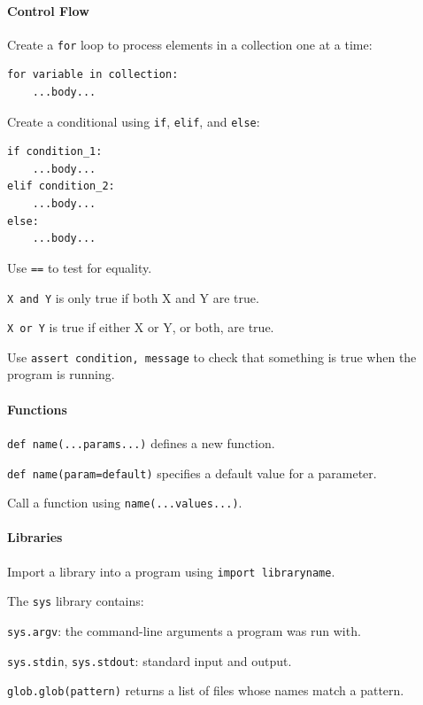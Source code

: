 \documentclass{book}
\begin{document}
\mbox{}\paragraph{Control Flow}

\begin{swcitemize}
\item
  Create a \texttt{for} loop to process elements in a collection one at
  a time:

\begin{verbatim}
for variable in collection:
    ...body...
\end{verbatim}
\item
  Create a conditional using \texttt{if}, \texttt{elif}, and
  \texttt{else}:

\begin{verbatim}
if condition_1:
    ...body...
elif condition_2:
    ...body...
else:
    ...body...
\end{verbatim}
\item
  Use \texttt{==} to test for equality.
\item
  \texttt{X and Y} is only true if both X and Y are true.
\item
  \texttt{X or Y} is true if either X or Y, or both, are true.
\item
  Use \texttt{assert condition, message} to check that something is true
  when the program is running.
\end{swcitemize}

\mbox{}\paragraph{Functions}

\begin{swcitemize}
\item
  \texttt{def name(...params...)} defines a new function.
\item
  \texttt{def name(param=default)} specifies a default value for a
  parameter.
\item
  Call a function using \texttt{name(...values...)}.
\end{swcitemize}

\mbox{}\paragraph{Libraries}

\begin{swcitemize}
\item
  Import a library into a program using \texttt{import libraryname}.
\item
  The \texttt{sys} library contains:

  \begin{swcitemize2}
  \item
    \texttt{sys.argv}: the command-line arguments a program was run
    with.
  \item
    \texttt{sys.stdin}, \texttt{sys.stdout}: standard input and output.
   \end{swcitemize2}
\item
  \texttt{glob.glob(pattern)} returns a list of files whose names match
  a pattern.
\end{swcitemize}
\end{document}
